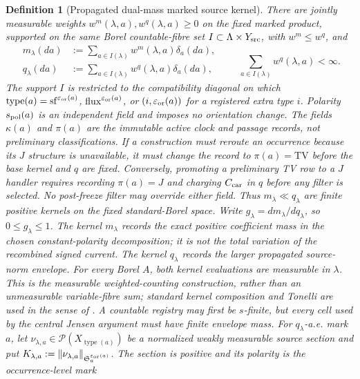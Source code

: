 \documentclass[11pt]{article}
\newtheorem{definition}[theorem]{Definition}
\begin{document}
\begin{definition}[Propagated dual-mass marked source kernel]
There are jointly measurable
weights $w^m(\lambda,a),w^q(\lambda,a)\ge0$ on the fixed marked product,
supported on the same Borel countable-fibre set
$I\subset\Lambda\times Y_{\rm src}$, with $w^m\le w^q$, and
\begin{equation}
\label{eq:marked-weighted-counting-kernel}
 \begin{aligned}
 m_\lambda(da)&:=\sum_{a\in I(\lambda)}w^m(\lambda,a)\delta_a(da),\\
 q_\lambda(da)&:=\sum_{a\in I(\lambda)}w^q(\lambda,a)\delta_a(da),
 \end{aligned}
 \qquad
 \sum_{a\in I(\lambda)}w^q(\lambda,a)<\infty.
\end{equation}
The support $I$ is restricted to the compatibility diagonal on which
$\operatorname{type}(a)=\mathrm{sf}^{\varepsilon_{\rm or}(a)}$,
$\mathrm{flux}^{\varepsilon_{\rm or}(a)}$, or
$(i,\varepsilon_{\rm or}(a))$ for a registered extra type $i$.  Polarity
$s_{\rm pol}(a)$ is an independent field and imposes no orientation change.
The fields $\kappa(a)$ and $\pi(a)$ are the immutable \emph{active} clock
and passage records, not preliminary classifications.  If a construction
must reroute an occurrence because its $J$ structure is unavailable, it
must change the record to $\pi(a)=\mathrm{TV}$ before the base kernel and
$q$ are fixed.  Conversely, promoting a preliminary TV row to a $J$ handler
requires recording $\pi(a)=J$ and charging $C_{\rm car}$ in $q$ before any
filter is selected.  No post-freeze filter may override either field.
Thus $m_\lambda\ll q_\lambda$ are finite positive kernels on the fixed
standard-Borel space.  Write $g_\lambda=dm_\lambda/dq_\lambda$, so
$0\le g_\lambda\le1$.  The kernel $m_\lambda$ records the exact positive
coefficient mass in the chosen constant-polarity decomposition; it is not
the total variation of the recombined signed current.  The kernel
$q_\lambda$ records the larger propagated source-norm envelope.
For every Borel $A$, both kernel evaluations are measurable in $\lambda$.
This is the measurable weighted-counting construction, rather than an
unmeasurable variable-fibre sum; standard kernel composition and Tonelli are
used in the sense of \cite{VakarOng}.  A countable registry may first be
$s$-finite, but every cell used by the central Jensen argument must have
finite envelope mass.  For $q_\lambda$-a.e. mark $a$, let
$\nu_{\lambda,a}\in\mathcal P(X_{\operatorname{type}(a)})$ be a normalized
weakly measurable source section and put
$K_{\lambda,a}:=\|\nu_{\lambda,a}\|_{
\mathfrak S_a^{\varepsilon_{\rm or}(a)}}$.
The section is positive and its polarity is the occurrence-level mark

\end{definition}
\end{document}
